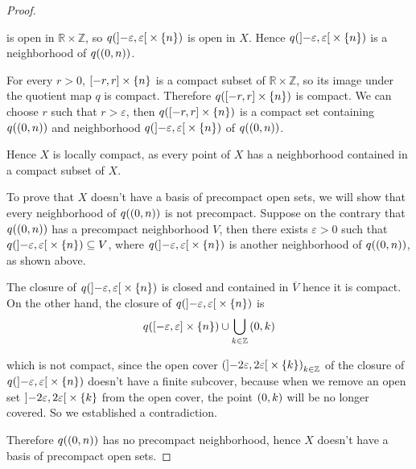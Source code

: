 \begin{proof}
\begin{enumerate}[label={\textbf{Case \arabic*.}}, itemindent=1cm]
		      is open in $\mathbb{R}\times\mathbb{Z}$, so $q(\left]{-\varepsilon, \varepsilon}\right[ \times \left\{{n}\right\})$ is open in $X$. Hence $q(\left]{-\varepsilon, \varepsilon}\right[ \times \left\{{n}\right\})$ is a neighborhood of $q(\left({0, n}\right))$.

		      For every $r > 0$, $\left[{-r, r}\right] \times \left\{{n}\right\}$ is a compact subset of $\mathbb{R}\times\mathbb{Z}$, so its image under the quotient map $q$ is compact. Therefore $q(\left[{-r, r}\right] \times \left\{{n}\right\})$ is compact. We can choose $r$ such that $r > \varepsilon$, then $q(\left[{-r, r}\right] \times \left\{{n}\right\})$ is a compact set containing $q(\left({0, n}\right))$ and neighborhood $q(\left]{-\varepsilon, \varepsilon}\right[ \times \left\{{n}\right\})$ of $q(\left({0, n}\right))$.
	\end{enumerate}

	Hence $X$ is locally compact, as every point of $X$ has a neighborhood contained in a compact subset of $X$.

	To prove that $X$ doesn't have a basis of precompact open sets, we will show that every neighborhood of $q(\left({0, n}\right))$ is not precompact. Suppose on the contrary that $q(\left({0, n}\right))$ has a precompact neighborhood $V$, then there exists $\varepsilon > 0$ such that $q(\left]{-\varepsilon, \varepsilon}\right[ \times \left\{{n}\right\}) \subseteq V$, where $q(\left]{-\varepsilon, \varepsilon}\right[ \times \left\{{n}\right\})$ is another neighborhood of $q(\left({0, n}\right))$, as shown above.

	The closure of $q(\left]{-\varepsilon, \varepsilon}\right[ \times \left\{{n}\right\})$ is closed and contained in $\overline{V}$ hence it is compact. On the other hand, the closure of $q(\left]{-\varepsilon, \varepsilon}\right[ \times \left\{{n}\right\})$ is
	\begin{align*}
		q(\left[{-\varepsilon, \varepsilon}\right] \times \left\{{n}\right\}) \cup \bigcup_{k\in\mathbb{Z}} \left({0, k}\right)
	\end{align*}

	which is not compact, since the open cover ${\left(\left]{-2\varepsilon, 2\varepsilon}\right[\times\left\{{k}\right\}\right)}_{k\in\mathbb{Z}}$ of the closure of $q(\left]{-\varepsilon, \varepsilon}\right[ \times \left\{{n}\right\})$ doesn't have a finite subcover, because when we remove an open set $\left]{-2\varepsilon, 2\varepsilon}\right[ \times \left\{{k}\right\}$ from the open cover, the point $\left({0, k}\right)$ will be no longer covered. So we established a contradiction.

	Therefore $q(\left({0,n}\right))$ has no precompact neighborhood, hence $X$ doesn't have a basis of precompact open sets.
\end{proof}

